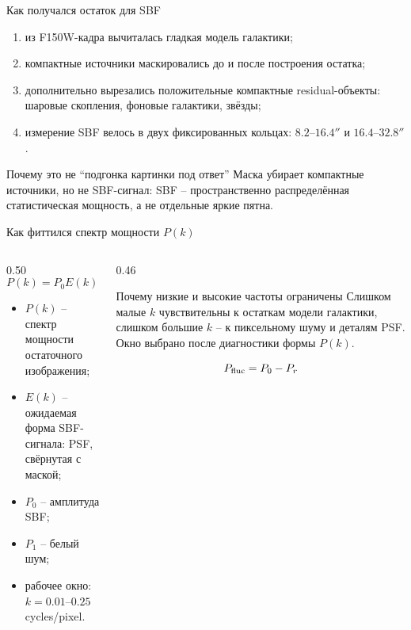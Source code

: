 \documentclass[aspectratio=169, 11pt]{beamer}
\begin{document}
\begin{frame}{Как получался остаток для SBF}
    \begin{enumerate}
        \item из F150W-кадра вычиталась гладкая модель галактики;
        \item компактные источники маскировались до и после построения остатка;
        \item дополнительно вырезались положительные компактные residual-объекты: шаровые скопления, фоновые галактики, звёзды;
        \item измерение SBF велось в двух фиксированных кольцах: $8.2$--$16.4''$ и $16.4$--$32.8''$.
    \end{enumerate}
    \vspace{0.15cm}
    \begin{block}{Почему это не ``подгонка картинки под ответ''}
        Маска убирает компактные источники, но не SBF-сигнал: SBF -- пространственно распределённая статистическая мощность, а не отдельные яркие пятна.
    \end{block}
\end{frame}

\begin{frame}{Как фиттился спектр мощности $P(k)$}
    \begin{columns}[T]
        \begin{column}{0.50\textwidth}
            \begin{equation*}
                P(k)=P_0E(k)+P_1
            \end{equation*}
            \begin{itemize}
                \item $P(k)$ -- спектр мощности остаточного изображения;
                \item $E(k)$ -- ожидаемая форма SBF-сигнала: PSF, свёрнутая с маской;
                \item $P_0$ -- амплитуда SBF;
                \item $P_1$ -- белый шум;
                \item рабочее окно: $k=0.01$--$0.25$ cycles/pixel.
            \end{itemize}
        \end{column}
        \begin{column}{0.46\textwidth}
            \begin{block}{Почему низкие и высокие частоты ограничены}
                Слишком малые $k$ чувствительны к остаткам модели галактики, слишком большие $k$ -- к пиксельному шуму и деталям PSF. Окно выбрано после диагностики формы $P(k)$.
            \end{block}
            \begin{equation*}
                P_{\rm fluc}=P_0-P_r
            \end{equation*}
        \end{column}
    \end{columns}
\end{frame}
\end{document}
